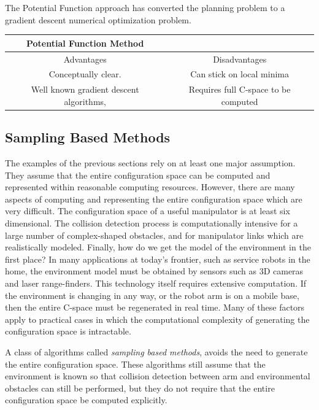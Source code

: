The Potential Function approach has converted the planning problem to a gradient descent numerical optimization problem.   

\vspace{0.2in}
\begin{tabular}{|c|c|} \hline
Potential Function Method & \\ \hline \hline
Advantages		    &  Disadvantages          			\\ \hline
Conceptually clear.	    &  Can stick on local minima       		\\ \hline
Well known gradient descent algorithms,   &  Requires full C-space to be computed   	\\ \hline
\end{tabular}
 
\subsection{Sampling Based Methods}

The examples of the previous sections rely on at least one major assumption.  They  assume that the entire configuration space can be computed and represented within reasonable computing resources.  However, there are many aspects of computing and representing the entire configuration space which are very difficult.  The configuration space of a useful manipulator is at least six dimensional.
The collision detection process is computationally intensive for a large number of complex-shaped obstacles, and for manipulator links which are realistically modeled. 
Finally, how do we get the model of the environment in the first place?   In many applications at today's frontier, such as service robots in the home, the environment model must be obtained by sensors such as 3D cameras and laser range-finders.  This technology itself requires extensive computation.  If the environment is changing in any way, or the robot arm is on a mobile base, then the entire C-space must be regenerated in real time.
Many of these factors apply to practical cases in which the  computational complexity of generating the configuration space is intractable. 

A class of algorithms called \textit{sampling based methods}, avoids the need to generate the entire configuration space.
These algorithms still assume that the environment is  known so that collision detection between arm and environmental obstacles can still be performed, but they do not require that the entire configuration space be computed explicitly. 

